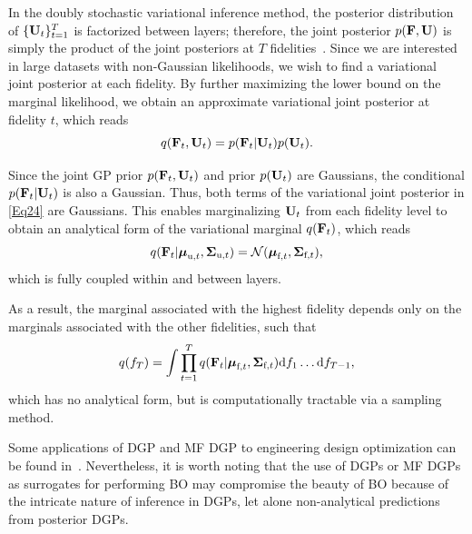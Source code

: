 \documentclass[iicol,sn-basic]{sn-jnl}%
\begin{document}
In the doubly stochastic variational inference method, the posterior distribution of $\{{\bf U}_t\}_{t=1}^T$ is factorized between
layers; therefore, the joint posterior $p({\bf F}, {\bf U})$ is simply the product of the joint posteriors at $T$ fidelities~\citep{Salimbeni2017}.
Since we are interested in large datasets with non-Gaussian likelihoods, we wish to find a variational joint posterior at each fidelity.
By further maximizing the lower bound on the marginal likelihood, we obtain an approximate variational joint posterior at fidelity $t$, which reads~\citep{Salimbeni2017}
\begin{equation}\label{Eq24}
	q({\bf F}_t,{\bf U}_t) = p({\bf F}_t|{\bf U}_t) p({\bf U}_t).
\end{equation}

Since the joint GP prior $p({\bf F}_t, {\bf U}_t)$ and prior $p({\bf U}_t)$ are Gaussians, the conditional $p({\bf F}_t|{\bf U}_t)$ is also a Gaussian.
Thus, both terms of the variational joint posterior in \cref{Eq24} are Gaussians.
This enables marginalizing ${\bf U}_t$ from each fidelity level to obtain an analytical form of the variational marginal $q({\bf F}_t)$, which reads
\begin{equation}\label{Eq25}
	q({\bf F}_t|{\boldsymbol \mu}_{\text{u},t},{\boldsymbol \Sigma}_{\text{u},t}) = \mathcal{N}({\boldsymbol \mu}_{\text{f},t},{\boldsymbol \Sigma}_{\text{f},t}),
\end{equation}
which is fully coupled within and between layers.

As a result, the marginal associated with the highest fidelity depends only
on the marginals associated with the other fidelities, such that
\begin{equation}\label{Eq26}
	q(f_{T}) = \int \prod_{t=1}^{T} q({\bf F}_t|{\boldsymbol \mu}_{\text{f},t},{\boldsymbol \Sigma}_{\text{f},t}) \text{d}f_{1} \dots \text{d}f_{T-1},
\end{equation}
which has no analytical form, but is computationally tractable via a sampling method.

Some applications of DGP and MF DGP to engineering design optimization can be found in~\cite{Hebbal2021oe,Hebbal2021smo}.
Nevertheless, it is worth noting that the use of DGPs or MF DGPs as surrogates for performing BO may compromise the beauty of BO because of the intricate nature of inference in DGPs, let alone non-analytical predictions from posterior DGPs.
\end{document}
